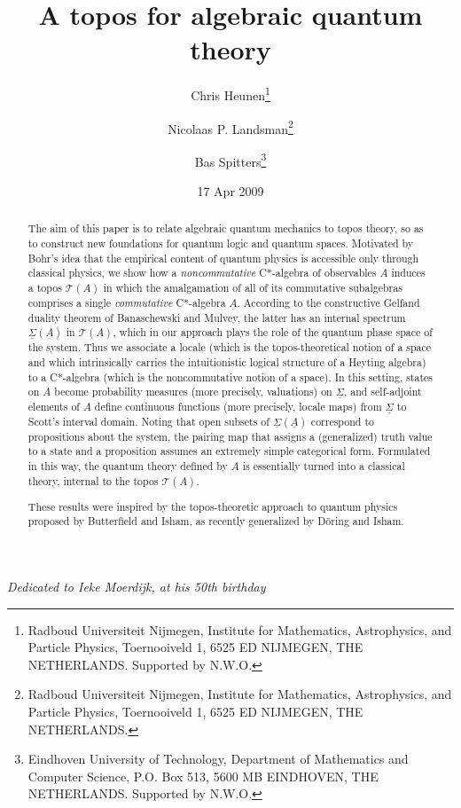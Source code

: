\documentclass[12pt]{article}
\date{17 Apr 2009}
\newcommand{\alg}[1]{\ensuremath{#1}}
\newcommand{\functor}[1]{\ensuremath{\underline{#1}}}
\newcommand{\asstopos}{\ensuremath{\mathcal{T}}}
\newcommand{\uS}{\underline{\Sigma}}
\newcommand{\uA}{\underline{A}}
\newcommand{\TA}{\mathcal{T}(A)}
\newcommand{\ulS}{\functor{\Sigma}}
\renewcommand{\TA}{\asstopos(\alg{A})}
\begin{document}
\title{A topos for algebraic quantum theory}
\author{Chris Heunen\footnote{Radboud Universiteit Nijmegen,
    Institute for Mathematics, Astrophysics, and Particle Physics,
    Toernooiveld 1, 6525 ED NIJMEGEN, THE NETHERLANDS.
    Supported by N.W.O.} \and
  Nicolaas P. Landsman\footnote{Radboud Universiteit Nijmegen,
    Institute for Mathematics, Astrophysics, and Particle Physics,
    Toernooiveld 1, 6525 ED NIJMEGEN, THE NETHERLANDS.} \and
  Bas Spitters\footnote{Eindhoven University of Technology,
    Department of Mathematics and Computer Science, P.O. Box 513, 5600
    MB EINDHOVEN, THE NETHERLANDS. Supported by N.W.O.}}
\maketitle
\vspace*{-0.75cm}
\begin{center}{\it
Dedicated to Ieke Moerdijk, at his 50th birthday}
\end{center}
\smallskip
\begin{abstract}
  The aim of this paper is to relate algebraic quantum mechanics to
  topos theory, so as to construct new foundations for quantum logic
  and quantum spaces. Motivated by Bohr's idea that the empirical
  content of quantum physics is accessible only through classical
  physics, we show how a {\it noncommutative} C*-algebra of observables $A$ induces a
  topos $\TA$ in which the amalgamation of all of its commutative
  subalgebras comprises a single {\it commutative} C*-algebra
  $\uA$. According to the constructive Gelfand duality theorem of
  Banaschewski and Mulvey, the latter has an internal spectrum
  $\ulS(\uA)$ in $\TA$, which in our approach plays the role of the
  quantum phase space  of the system. Thus we associate a locale
  (which is the topos-theoretical notion of a space and which
  intrinsically carries  the intuitionistic logical structure of a
  Heyting algebra) to a  C*-algebra (which is the noncommutative
  notion of a space). In this setting,  states on $A$ become
  probability measures (more precisely, valuations) on $\uS$, and
  self-adjoint elements of $A$ define continuous functions  (more
  precisely, locale maps) from  $\uS$ to Scott's interval
  domain. Noting that open subsets of  $\ulS(\uA)$ correspond to
  propositions about the system, the pairing map that assigns a
  (generalized) truth value to a state and a proposition assumes an
  extremely simple categorical form. Formulated in this way, the
  quantum theory defined by $A$ is essentially turned into a classical
  theory, internal to the topos $\TA$.

  These results were inspired by the topos-theoretic approach to
  quantum physics proposed by Butterfield and Isham, as recently generalized by D\"{o}ring and Isham.
\end{abstract}
\end{document}

